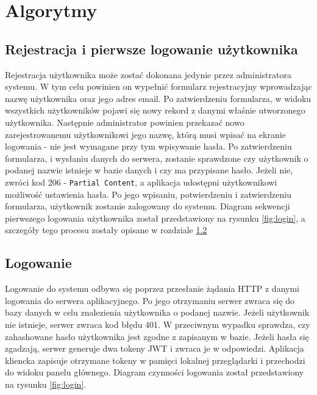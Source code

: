 \section{Algorytmy}

\subsection{Rejestracja i pierwsze logowanie użytkownika}

Rejestracja użytkownika może zostać dokonana jedynie przez administratora systemu. W tym celu powinien on wypełnić formularz rejestracyjny wprowadzając nazwę użytkownika oraz jego adres email. Po zatwierdzeniu formularza, w widoku wszystkich użytkowników pojawi się nowy rekord z danymi właśnie utworzonego użytkownika. Następnie administrator powinien przekazać nowo zarejestrowanemu użytkownikowi jego nazwę, którą musi wpisać na ekranie logowania - nie jest wymagane przy tym wpisywanie hasła. Po zatwierdzeniu formularza, i wysłaniu danych do serwera, zostanie sprawdzone czy użytkownik o podanej nazwie istnieje w bazie danych i czy ma przypisane hasło. Jeżeli nie, zwróci kod 206 - \texttt{Partial Content}, a aplikacja udostępni użytkownikowi możliwość ustawienia hasła. Po jego wpisaniu, potwierdzeniu i zatwierdzeniu formularza, użytkownik zostanie zalogowany do systemu. Diagram sekwencji pierwszego logowania użytkownika został przedstawiony na rysunku \ref{fig:login}, a szczegóły tego procesu zostały opisane w rozdziale \ref{ss:logowanie}

\subsection{Logowanie}
\label{ss:logowanie}

Logowanie do systemu odbywa się poprzez przesłanie żądania HTTP z danymi logowania do serwera aplikacyjnego. Po jego otrzymaniu serwer zwraca się do bazy danych w celu znalezienia użytkownika o podanej nazwie. Jeżeli użytkownik nie istnieje, serwer zwraca kod błędu 401. W przeciwnym wypadku sprawdza, czy zahashowane hasło użytkownika jest zgodne z zapisanym w bazie. Jeżeli hasła się zgadzają, serwer generuje dwa tokeny JWT i zwraca je w odpowiedzi. Aplikacja kliencka zapisuje otrzymane tokeny w pamięci lokalnej przeglądarki i przechodzi do widoku panelu głównego. Diagram czynności logowania został przedstawiony na rysunku \ref{fig:login}.


